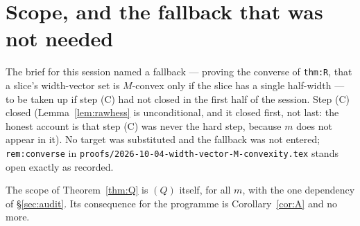 \documentclass[11pt]{article}
\theoremstyle{plain}
\theoremstyle{definition}
\begin{document}


\section{Scope, and the fallback that was not needed}

The brief for this session named a fallback --- proving the converse of \texttt{thm:R},
that a slice's width-vector set is $M$-convex only if the slice has a single half-width ---
to be taken up if step (C) had not closed in the first half of the session. Step (C) closed
(Lemma~\ref{lem:rawhess} is unconditional, and it closed first, not last: the honest
account is that step (C) was never the hard step, because $m$ does not appear in it). No
target was substituted and the fallback was not entered; \texttt{rem:converse} in
\texttt{proofs/2026-10-04-width-vector-M-convexity.tex} stands open exactly as recorded.

The scope of Theorem~\ref{thm:Q} is $(Q)$ itself, for all $m$, with the one dependency of
\S\ref{sec:audit}. Its consequence for the programme is Corollary~\ref{cor:A} and no more.
\end{document}
